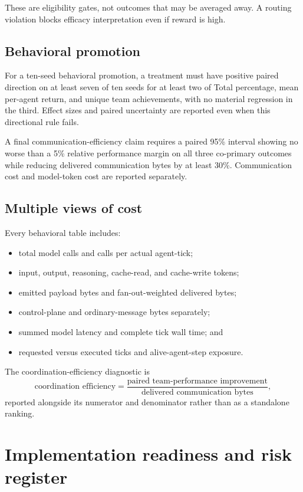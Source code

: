 \documentclass[11pt]{article}
\begin{document}
These are eligibility gates, not outcomes that may be averaged away.  A routing
violation blocks efficacy interpretation even if reward is high.

\subsection{Behavioral promotion}

For a ten-seed behavioral promotion, a treatment must have positive paired
direction on at least seven of ten seeds for at least two of Total percentage,
mean per-agent return, and unique team achievements, with no material
regression in the third.  Effect sizes and paired uncertainty are reported even
when this directional rule fails.

A final communication-efficiency claim requires a paired 95\% interval showing
no worse than a 5\% relative performance margin on all three co-primary
outcomes while reducing delivered communication bytes by at least 30\%.
Communication cost and model-token cost are reported separately.

\subsection{Multiple views of cost}

Every behavioral table includes:

\begin{itemize}
  \item total model calls and calls per actual agent-tick;
  \item input, output, reasoning, cache-read, and cache-write tokens;
  \item emitted payload bytes and fan-out-weighted delivered bytes;
  \item control-plane and ordinary-message bytes separately;
  \item summed model latency and complete tick wall time; and
  \item requested versus executed ticks and alive-agent-step exposure.
\end{itemize}

The coordination-efficiency diagnostic is
\[
\text{coordination efficiency}=
\frac{\text{paired team-performance improvement}}
     {\text{delivered communication bytes}},
\]
reported alongside its numerator and denominator rather than as a standalone
ranking.

\section{Implementation readiness and risk register}
\end{document}
